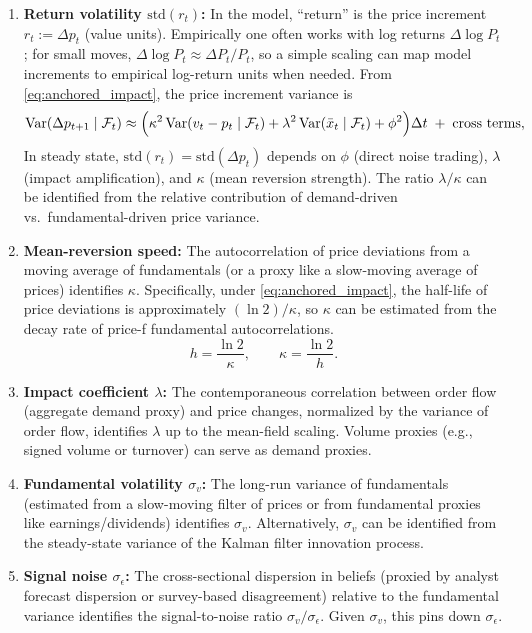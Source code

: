 \begin{enumerate}
\item \textbf{Return volatility $\mathrm{std}(r_t)$:} In the model, ``return'' is the price increment $r_t := \Delta p_t$ (value units). Empirically one often works with log returns $\Delta\log P_t$; for small moves, $\Delta\log P_t \approx \Delta P_t/P_t$, so a simple scaling can map model increments to empirical log-return units when needed. From \eqref{eq:anchored_impact}, the price increment variance is
\[
\text{Var}(\Delta p_{t+1}\mid \mathcal F_t) \approx
\Big(\kappa^2\,\text{Var}(v_t-p_t\mid \mathcal F_t)+\lambda^2\,\text{Var}(\bar x_t\mid \mathcal F_t)+\phi^2\Big)\Delta t
\;+\;\text{cross terms},
\]
In steady state, $\mathrm{std}(r_t) = \mathrm{std}(\Delta p_t)$ depends on $\phi$ (direct noise trading), $\lambda$ (impact amplification), and $\kappa$ (mean reversion strength). The ratio $\lambda/\kappa$ can be identified from the relative contribution of demand-driven vs.\ fundamental-driven price variance.

\item \textbf{Mean-reversion speed:} The autocorrelation of price deviations from a moving average of fundamentals (or a proxy like a slow-moving average of prices) identifies $\kappa$. Specifically, under \eqref{eq:anchored_impact}, the half-life of price deviations is approximately $(\ln 2)/\kappa$, so $\kappa$ can be estimated from the decay rate of price-f fundamental autocorrelations.
\begin{equation}
h = \frac{\ln 2}{\kappa},\qquad \kappa = \frac{\ln 2}{h}.
\label{eq:half_life_conversion}
\end{equation}

\item \textbf{Impact coefficient $\lambda$:} The contemporaneous correlation between order flow (aggregate demand proxy) and price changes, normalized by the variance of order flow, identifies $\lambda$ up to the mean-field scaling. Volume proxies (e.g., signed volume or turnover) can serve as demand proxies.

\item \textbf{Fundamental volatility $\sigma_v$:} The long-run variance of fundamentals (estimated from a slow-moving filter of prices or from fundamental proxies like earnings/dividends) identifies $\sigma_v$. Alternatively, $\sigma_v$ can be identified from the steady-state variance of the Kalman filter innovation process.

\item \textbf{Signal noise $\sigma_\epsilon$:} The cross-sectional dispersion in beliefs (proxied by analyst forecast dispersion or survey-based disagreement) relative to the fundamental variance identifies the signal-to-noise ratio $\sigma_v/\sigma_\epsilon$. Given $\sigma_v$, this pins down $\sigma_\epsilon$.
\end{enumerate}

